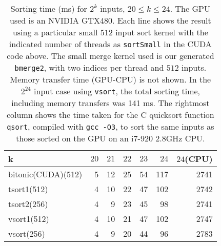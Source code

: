 

\begin{table}
\begin{center}
  \begin{tabular}{| l | r | r | r | r | r | r | }
    \hline
        k                             &  $20$ &  $21$ & $22$& $23$ & $24$ & $24$(CPU)  \\ \hline
    bitonic(CUDA)(512)                &  5 & 12 & 25 & 54 & 117 & 2741   \\      
    tsort1(512)                       &  4 & 10 & 22 & 47 & 102 & 2742    \\
    tsort2(256)                       &  4 & 9 & 23 & 45 & 98 & 2741     \\ 
    vsort1(512)                       &  4 & 10 & 21 & 47 & 102 & 2747    \\ 
    vsort(256)                        &  4 & 9 & 20 & 44 & 96 & 2783    \\ 
    \hline
  \end{tabular}
\end{center}
\label{fig:table}
\caption{Sorting time (ms) for $2^k$ inputs, $20 \leq k \leq 24$.  The GPU used is an NVIDIA GTX480.
Each line shows the result using a particular small $512$ input sort kernel with the
indicated number of threads as {\tt sortSmall} in the CUDA code above. The small merge kernel used
is our generated {\tt bmerge2}, with two indices per thread and $512$ inputs. Memory transfer time (GPU-CPU)
is not shown. In the $2^{24}$ input case using {\tt vsort}, the total sorting time, including
memory transfers was 141 ms.
The rightmost column shows the time taken for the C quicksort function {\tt qsort}, compiled with
{\tt gcc -O3}, to sort the same inputs as those sorted on the GPU on an i7-920 2.8GHz CPU.
} 
\end{table}




